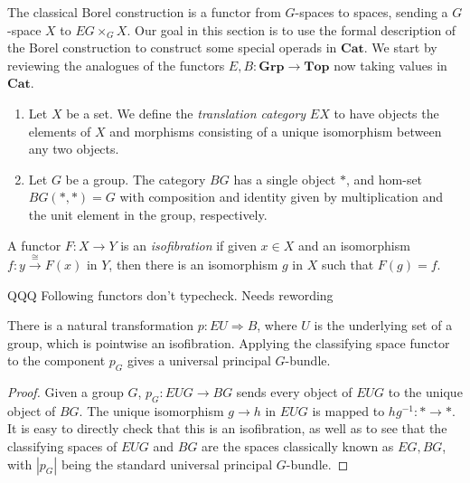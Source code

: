 \documentclass{amsbook} %
\newcommand{\mb}{\mathbf}
\numberwithin{section}{chapter}
\begin{document}
The classical Borel construction is a functor from $G$-spaces to spaces, sending a $G$-space $X$ to $EG \times_{G} X$.  Our goal in this section is to use the formal description of the Borel construction to construct some special operads in $\mb{Cat}$.   We start by reviewing the analogues of the functors $E, B:\mb{Grp} \rightarrow \mb{Top}$ now taking values in $\mb{Cat}$.

\begin{Defi}\label{Defi:e_b}
\begin{enumerate}
\item Let $X$ be a set.  We define the \textit{translation category} $EX$ to have objects the elements of $X$ and morphisms consisting of a unique isomorphism between any two objects.
\item Let $G$ be a group.  The category $BG$ has a single object $*$, and hom-set $BG(*,*) = G$ with composition and identity given by multiplication and the unit element in the group, respectively.
\end{enumerate}
\end{Defi}

\begin{Defi}
A functor $F \colon X \to Y$ is an \emph{isofibration} if given $x \in X$ and an isomorphism $f\colon y \xrightarrow{\cong} F(x)$ in $Y$, then there is an isomorphism $g$ in $X$ such that $F(g) = f$.
\end{Defi}
QQQ Following functors don't typecheck. Needs rewording
\begin{prop}
There is a natural transformation $p:EU \Rightarrow B$, where $U$ is the underlying set of a group, which is pointwise an isofibration.  Applying the classifying space functor to the component $p_{G}$ gives a universal principal $G$-bundle.
\end{prop}
\begin{proof}
Given a group $G$, $p_{G}:EUG \rightarrow BG$ sends every object of $EUG$ to the unique object of $BG$.  The unique isomorphism $g \rightarrow  h$ in $EUG$ is mapped to $hg^{-1}:* \rightarrow *$.  It is easy to directly check that this is an isofibration, as well as to see that the classifying spaces of $EUG$ and $BG$ are the spaces classically known as $EG,BG$, with $|p_{G}|$ being the standard universal principal $G$-bundle.
\end{proof}
\end{document}
